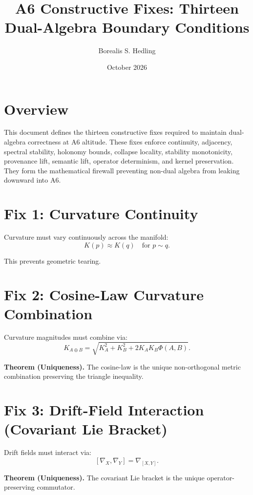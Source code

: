 \documentclass[11pt]{article}
\title{A6 Constructive Fixes: Thirteen Dual-Algebra Boundary Conditions}
\author{Borealis S. Hedling}
\date{October 2026}
\begin{document}
\maketitle

\section*{Overview}

This document defines the thirteen constructive fixes required to maintain
dual-algebra correctness at A6 altitude. These fixes enforce continuity,
adjacency, spectral stability, holonomy bounds, collapse locality, stability
monotonicity, provenance lift, semantic lift, operator determinism, and kernel
preservation. They form the mathematical firewall preventing non-dual algebra
from leaking downward into A6.

\section{Fix 1: Curvature Continuity}

Curvature must vary continuously across the manifold:
\[
K(p) \approx K(q) \quad \text{for } p \sim q.
\]

This prevents geometric tearing.

\section{Fix 2: Cosine-Law Curvature Combination}

Curvature magnitudes must combine via:
\[
K_{A\oplus B}
  = \sqrt{K_A^2 + K_B^2 + 2 K_A K_B \Phi(A,B)}.
\]

\textbf{Theorem (Uniqueness).}
The cosine-law is the unique non-orthogonal metric combination preserving the
triangle inequality.

\section{Fix 3: Drift-Field Interaction (Covariant Lie Bracket)}

Drift fields must interact via:
\[
[\nabla_X,\nabla_Y] = \nabla_{[X,Y]}.
\]

\textbf{Theorem (Uniqueness).}
The covariant Lie bracket is the unique operator-preserving commutator.
\end{document}
